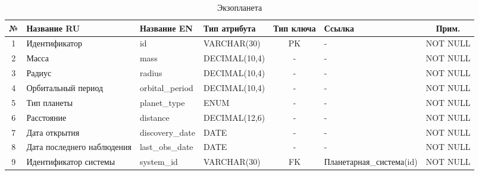 \documentclass[14pt,a4paper]{extarticle}
\begin{document}
	\begin{table}[H]
		\centering
		\caption{Экзопланета}
		\small
		\begin{tabular}{|c|p{3.2cm}|p{2.6cm}|p{2.8cm}|c|p{2.5cm}|c|}
\hline
№ & Название RU & Название EN & Тип атрибута & Тип ключа & Ссылка & Прим. \\
\hline
1 & Идентификатор & id & VARCHAR(30) & PK & - & NOT NULL \\
2 & Масса & mass & DECIMAL(10,4) & - & - & NOT NULL \\
3 & Радиус & radius & DECIMAL(10,4) & - & - & NOT NULL \\
4 & Орбитальный период & orbital_period & DECIMAL(10,4) & - & - & NOT NULL \\
5 & Тип планеты & planet_type & ENUM & - & - & NOT NULL \\
6 & Расстояние & distance & DECIMAL(12,6) & - & - & NOT NULL \\
7 & Дата открытия & discovery_date & DATE & - & - & NOT NULL \\
8 & Дата последнего наблюдения & last_obs_date & DATE & - & - & NOT NULL \\
9 & Идентификатор системы & system_id & VARCHAR(30) & FK & Планетарная_система(id) & NOT NULL \\
\hline
\end{tabular}
	\end{table}
\end{document}
